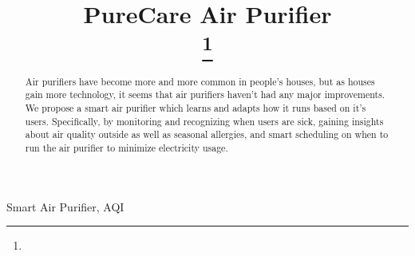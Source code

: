 \documentclass[conference]{IEEEtran}
\begin{document}
\title{PureCare Air Purifier\\

\thanks{}
}

\author{
\and
{}
\and
{}
\and
{}
}

\maketitle

\begin{abstract}
Air purifiers have become more and more common in people’s houses, but as houses gain more technology, it seems that air purifiers haven’t had any major improvements. We propose a smart air purifier which learns and adapts how it runs based on it’s users. Specifically, by monitoring and recognizing when users are sick, gaining insights about air quality outside as well as seasonal allergies, and smart scheduling on when to run the air purifier to minimize electricity usage.
\end{abstract}

\begin{IEEEkeywords}
Smart Air Purifier, AQI
\end{IEEEkeywords}
\end{document}
